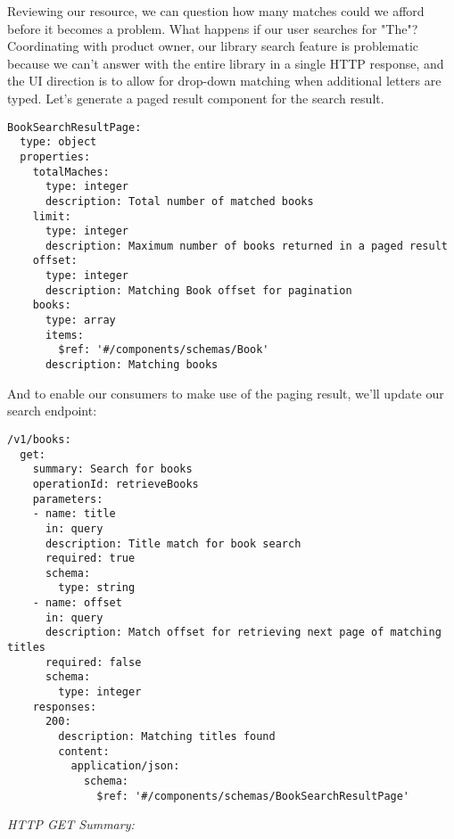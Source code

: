 Reviewing our resource, we can question how many matches could we afford before it becomes a problem.  What happens if our user searches for "The"?  Coordinating with product owner, our library search feature is problematic because we can't answer with the entire library in a single HTTP response, and the UI direction is to allow for drop-down matching when additional letters are typed.  Let's generate a paged result component for the search result.

\begin{minipage}{\linewidth}

\begin{code}
\begin{lstlisting}[belowskip=-\baselineskip]
BookSearchResultPage:
  type: object
  properties:
    totalMaches:
      type: integer
      description: Total number of matched books
    limit:
      type: integer
      description: Maximum number of books returned in a paged result
    offset:
      type: integer
      description: Matching Book offset for pagination
    books:
      type: array
      items:
        $ref: '#/components/schemas/Book'
      description: Matching books
\end{lstlisting}
\end{code}
\end{minipage}

And to enable our consumers to make use of the paging result, we'll update our search endpoint:

\begin{minipage}{\linewidth}
\begin{code}
\begin{lstlisting}[belowskip=-\baselineskip]
/v1/books:
  get:
    summary: Search for books
    operationId: retrieveBooks
    parameters:
    - name: title
      in: query
      description: Title match for book search
      required: true
      schema:
        type: string
    - name: offset
      in: query
      description: Match offset for retrieving next page of matching titles
      required: false
      schema:
        type: integer
    responses:
      200:
        description: Matching titles found
        content:
          application/json:
            schema:
              $ref: '#/components/schemas/BookSearchResultPage'
\end{lstlisting}
\end{code}
\end{minipage}

\emph{HTTP GET Summary:}

